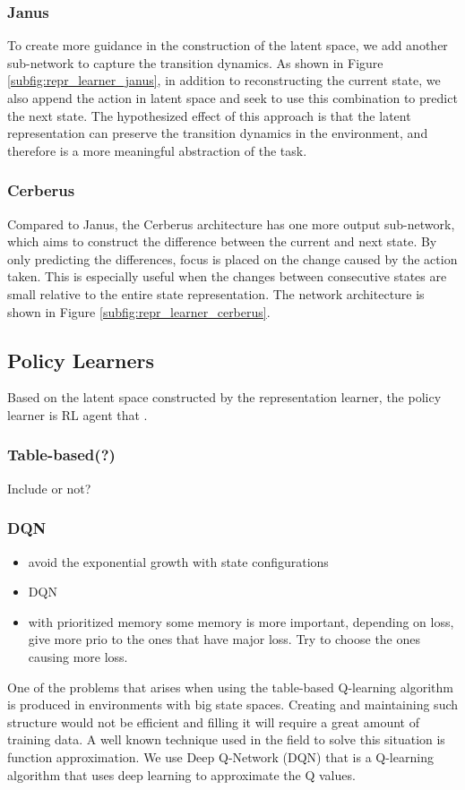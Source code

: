 \subsubsection{Janus}
To create more guidance in the construction of the latent space, we add another sub-network to capture the transition dynamics. 
As shown in Figure \ref{subfig:repr_learner_janus},
in addition to reconstructing the current state, we also append the action in latent space and seek to use this combination to predict the next state.
The hypothesized effect of this approach is that the latent representation can preserve the transition dynamics in the environment, and therefore is a more meaningful abstraction of the task.


\subsubsection{Cerberus}
Compared to Janus, the Cerberus architecture has one more output sub-network, which aims to construct the difference between the current and next state. 
By only predicting the differences, focus is placed on the change caused by the action taken.
This is especially useful when the changes between consecutive states are small relative to the entire state representation.
The network architecture is shown in Figure \ref{subfig:repr_learner_cerberus}.  

\subsection{Policy Learners}
Based on the latent space constructed by the representation learner, the policy learner is RL agent that .

\subsubsection{Table-based(?)}
Include or not?

\subsubsection{DQN}
\begin{itemize}
	\item avoid the exponential growth with state configurations
	\item DQN \citep{DQN} 
	\item with prioritized memory \citep{prioritized_memory} some memory is more important, depending on loss, give more prio to the ones that have major loss. Try to choose the ones causing more loss. 
\end{itemize}
One of the problems that arises when using the table-based Q-learning algorithm is produced in environments with big state spaces. Creating and maintaining such structure would not be efficient and filling it will require a great amount of training data.
A well known technique used in the field to solve this situation is function approximation. We use Deep Q-Network (DQN) \citep{DQN} that is a Q-learning algorithm that uses deep learning to approximate the Q values.

